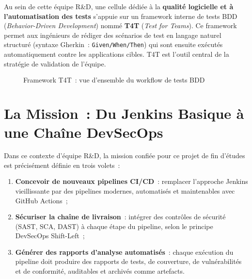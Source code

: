 Au sein de cette équipe R\&D, une cellule dédiée à la \textbf{qualité logicielle et à
l'automatisation des tests} s'appuie sur un framework interne de tests BDD
(\textit{Behavior-Driven Development}) nommé \textbf{T4T} (\textit{Test for Teams}).
Ce framework permet aux ingénieurs de rédiger des scénarios de test en langage naturel
structuré (syntaxe Gherkin~: \texttt{Given/When/Then}) qui sont ensuite exécutés
automatiquement contre les applications cibles. T4T est l'outil central de la stratégie
de validation de l'équipe.

\begin{figure}[H]
    \centering
    \caption{Framework T4T~: vue d'ensemble du workflow de tests BDD}
    \label{fig:t4t_overview}
\end{figure}


\section{La Mission~: Du Jenkins Basique à une Chaîne DevSecOps}

Dans ce contexte d'équipe R\&D, la mission confiée pour ce projet de fin d'études est
précisément définie en trois volets~:

\begin{enumerate}
    \item \textbf{Concevoir de nouveaux pipelines CI/CD}~: remplacer l'approche Jenkins
    vieillissante par des pipelines modernes, automatisés et maintenables avec GitHub Actions~;
    \item \textbf{Sécuriser la chaîne de livraison}~: intégrer des contrôles de sécurité
    (SAST, SCA, DAST) à chaque étape du pipeline, selon le principe DevSecOps Shift-Left~;
    \item \textbf{Générer des rapports d'analyse automatisés}~: chaque exécution du pipeline
    doit produire des rapports de tests, de couverture, de vulnérabilités et de conformité,
    auditables et archivés comme artefacts.
\end{enumerate}

